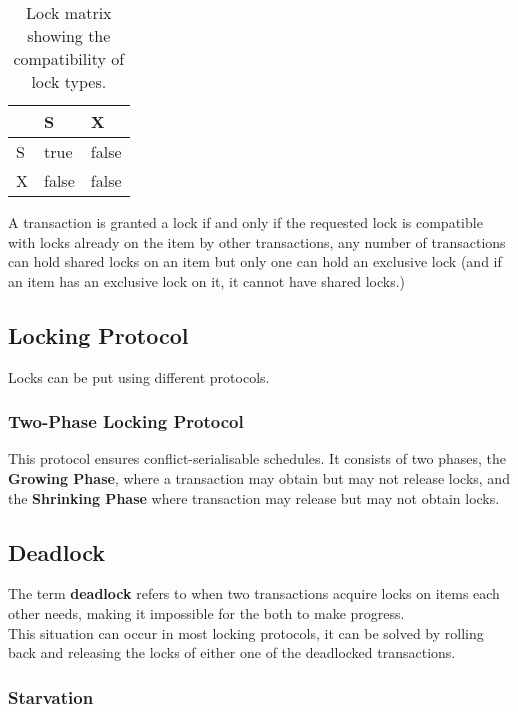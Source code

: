 \documentclass[11pt,a4paper,twocolumn]{book}
\begin{document}
\begin{table}
\begin{tabular}{l|l|l}
\toprule
& S & X\\
\hline
S & true & false\\ \hline
X & false & false\\
\bottomrule
\end{tabular}
\caption{Lock matrix showing the compatibility of lock types.}
\label{tab:lockmatrix}
\end{table}

A transaction is granted a lock if and only if the requested lock is compatible with locks already on the item by other transactions, any number of transactions can hold shared locks on an item but only one can hold an exclusive lock (and if an item has an exclusive lock on it, it cannot have shared locks.)


\subsection{Locking Protocol}

Locks can be put using different protocols.

\subsubsection{Two-Phase Locking Protocol}

This protocol ensures conflict-serialisable schedules. It consists of two phases, the \textbf{Growing Phase}, where a transaction may obtain but may not release locks, and the \textbf{Shrinking Phase} where transaction may release but may not obtain locks.

\subsection{Deadlock}

The term \textbf{deadlock} refers to when two transactions acquire locks on items each other needs, making it impossible for the both to make progress.\\

This situation can occur in most locking protocols, it can be solved by rolling back and releasing the locks of either one of the deadlocked transactions.

\subsubsection{Starvation}
\end{document}
